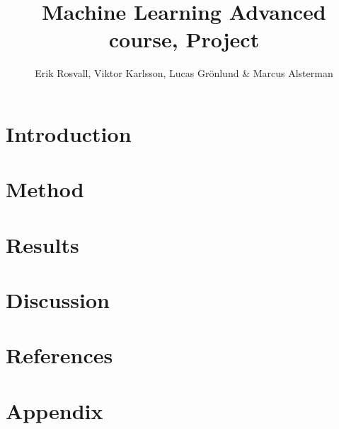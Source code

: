 \documentclass[10pt,a4paper,titlepage]{article}
\author{Erik Rosvall, Viktor Karlsson, Lucas Grönlund \& Marcus Alsterman}
\title{Machine Learning Advanced course, Project}
\begin{document}
	\maketitle
	
	\section{Introduction}
	
	
	\section{Method}
	
	
	\section{Results}
	
	
	\section{Discussion}
	
	
	\section{References}
	
	
	\section*{Appendix}
	
\end{document}
